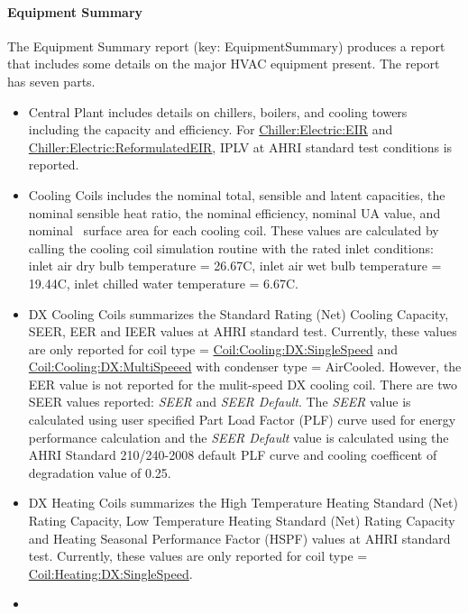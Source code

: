 \paragraph{Equipment Summary}\label{equipment-summary}

The Equipment Summary report (key: EquipmentSummary) produces a report that includes some details on the major HVAC equipment present. The report has seven parts.

\begin{itemize}
\item
  Central Plant includes details on chillers, boilers, and cooling towers including the capacity and efficiency. For \hyperref[chillerelectriceir]{Chiller:Electric:EIR} and \hyperref[chillerelectricreformulatedeir]{Chiller:Electric:ReformulatedEIR}, IPLV at AHRI standard test conditions is reported.
\item
  Cooling Coils includes the nominal total, sensible and latent capacities, the nominal sensible heat ratio, the nominal efficiency, nominal UA value, and nominal~ surface area for each cooling coil. These values are calculated by calling the cooling coil simulation routine with the rated inlet conditions: inlet air dry bulb temperature = 26.67C, inlet air wet bulb temperature = 19.44C, inlet chilled water temperature = 6.67C.
\item
  DX Cooling Coils summarizes the Standard Rating (Net) Cooling Capacity, SEER, EER and IEER values at AHRI standard test. Currently, these values are only reported for coil type = \hyperref[coilcoolingdxsinglespeed]{Coil:Cooling:DX:SingleSpeed} and \hyperref[coilcoolingdxmultispeed]{Coil:Cooling:DX:MultiSpeeed} with condenser type = AirCooled. However, the EER value is not reported for the mulit-speed DX cooling coil. There are two SEER values reported: \textit{SEER} and \textit{SEER Default}. The \textit{SEER} value is calculated using user specified Part Load Factor (PLF) curve used for energy performance calculation and the \textit{SEER Default} value is calculated using the AHRI Standard 210/240-2008 default PLF curve and cooling coefficent of degradation value of 0.25. 
  \item
  DX Heating Coils summarizes the High Temperature Heating Standard (Net) Rating Capacity, Low Temperature Heating Standard (Net) Rating Capacity and Heating Seasonal Performance Factor (HSPF) values at AHRI standard test. Currently, these values are only reported for coil type = \hyperref[coilheatingdxsinglespeed]{Coil:Heating:DX:SingleSpeed}.
\item

\end{itemize}
